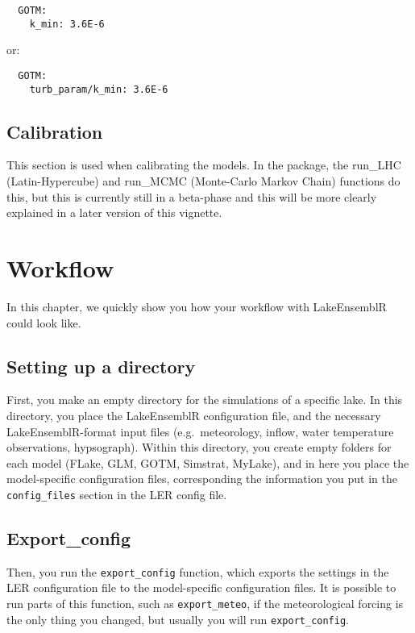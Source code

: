 \documentclass[
]{article}
\begin{document}
\begin{verbatim}
  GOTM:
    k_min: 3.6E-6
\end{verbatim}

or:

\begin{verbatim}
  GOTM:
    turb_param/k_min: 3.6E-6
\end{verbatim}

\hypertarget{calibration}{%
\subsection{Calibration}\label{calibration}}

This section is used when calibrating the models. In the package, the
run\_LHC (Latin-Hypercube) and run\_MCMC (Monte-Carlo Markov Chain)
functions do this, but this is currently still in a beta-phase and this
will be more clearly explained in a later version of this vignette.

\hypertarget{workflow}{%
\section{Workflow}\label{workflow}}

In this chapter, we quickly show you how your workflow with LakeEnsemblR
could look like.

\hypertarget{setting-up-a-directory}{%
\subsection{Setting up a directory}\label{setting-up-a-directory}}

First, you make an empty directory for the simulations of a specific
lake. In this directory, you place the LakeEnsemblR configuration file,
and the necessary LakeEnsemblR-format input files (e.g.~meteorology,
inflow, water temperature observations, hypsograph). Within this
directory, you create empty folders for each model (FLake, GLM, GOTM,
Simstrat, MyLake), and in here you place the model-specific
configuration files, corresponding the information you put in the
\texttt{config\_files} section in the LER config file.

\hypertarget{export_config}{%
\subsection{Export\_config}\label{export_config}}

Then, you run the \texttt{export\_config} function, which exports the
settings in the LER configuration file to the model-specific
configuration files. It is possible to run parts of this function, such
as \texttt{export\_meteo}, if the meteorological forcing is the only
thing you changed, but usually you will run \texttt{export\_config}.
\end{document}
